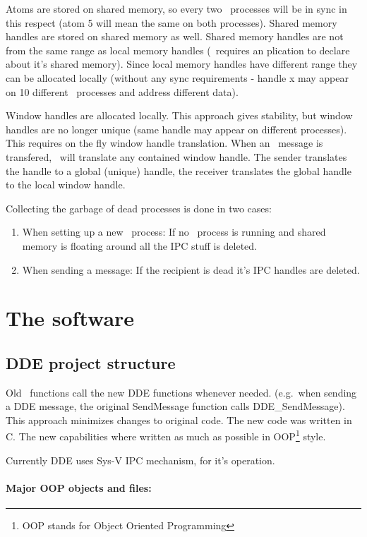 Atoms are stored on shared memory, so every two \Wine\ processes will
be in sync in this respect (atom 5 will mean the same on both
processes). Shared memory handles are stored on shared memory as
well. Shared memory handles are not from the same range as local
memory handles (\windoz\ requires an plication to declare about it's
shared memory). Since local memory handles have different range they
can be allocated locally (without any sync requirements - handle x may
appear on 10 different \Wine\ processes and address different data).

Window handles are allocated locally. This approach gives stability,
but window handles are no longer unique (same handle may appear
on different processes). This requires on the fly window handle
translation. When an \windoz\ message is transfered, \Wine\ will
translate any contained window handle. The sender translates the
handle to a global (unique) handle, the receiver translates the global
handle to the local window handle.

Collecting the garbage of dead processes is done in two cases:
\begin{enumerate}
  \item When setting up a new \Wine\ process: If no \Wine\ process is
    running and shared memory is floating around all the IPC stuff is
    deleted. 
  \item When sending a message: If the recipient is dead it's IPC
    handles are deleted.
\end{enumerate}



\section{The software}

\subsection{DDE project structure}
Old \Wine\ functions call the new DDE functions whenever needed.
(e.g.\ when sending a DDE message, the original SendMessage function calls
DDE\_SendMessage). This approach minimizes changes to original \Wine{}
code. The new code was written in C. The new capabilities where written
as much as possible in OOP\footnote{OOP stands for Object Oriented
Programming}{} style.

Currently DDE uses Sys-V IPC mechanism, for it's operation.


\paragraph{Major OOP objects and files:}

